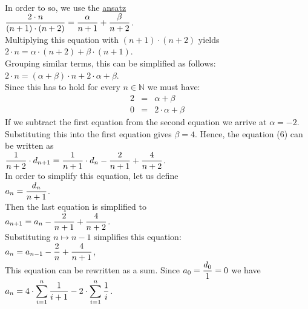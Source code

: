 \\[0.2cm] 
In order to so, we use the \href{http://en.wikipedia.org/wiki/Ansatz}{ansatz}
\\[0.2cm]
\hspace*{1.3cm}
$\displaystyle\frac{2\cdot n}{(n+1)\cdot(n+2)} = \frac{\alpha}{n+1} + \frac{\beta}{n+2}$.
\\[0.2cm] 
Multiplying this equation with $(n+1) \cdot (n+2)$ yields
\\[0.2cm]
\hspace*{1.3cm}
$ 2\cdot n = \alpha \cdot (n+2) + \beta \cdot (n+1)$.
\\[0.2cm]
Grouping similar terms, this can be simplified as follows:
\\[0.2cm]
\hspace*{1.3cm}
$2\cdot n = (\alpha + \beta) \cdot n + 2 \cdot \alpha  + \beta$.
\\[0.2cm]
Since this has to hold for every $n \in \mathbb{N}$ we must have:
\begin{eqnarray*}
  2 & = & \alpha + \beta \\
  0 & = & 2 \cdot \alpha + \beta 
\end{eqnarray*}
If we subtract the first equation from the second equation we arrive at
 $\alpha = -2$.  Substituting this into the first equation gives $\beta = 4$.
Hence, the equation (6) can be written as
\\[0.2cm]
\hspace*{1.3cm}
$\displaystyle\frac{1}{n+2} \cdot d_{n+1} = \frac{1}{n+1}\cdot d_{n} - \frac{2}{n+1} + \frac{4}{n+2}$.  
\\[0.2cm]  
In order to simplify this equation, let us define
\\[0.2cm]
\hspace*{1.3cm}
 $\displaystyle a_n = \frac{d_n}{n+1}$. 
\\[0.2cm] 
Then the last equation is simplified to
\\[0.2cm]
\hspace*{1.3cm}
$\displaystyle a_{n+1} = a_{n} - \frac{2}{n+1} + \frac{4}{n+2}$.
\\[0.2cm] 
Substituting $n \mapsto n-1$ simplifies this equation: 
\\[0.2cm]
\hspace*{1.3cm}
$\displaystyle a_{n} = a_{n-1} - \frac{2}{n} + \frac{4}{n+1}$,
\\[0.2cm] 
This equation can be rewritten as a sum.  Since $a_0 = \displaystyle\frac{d_0}{1} = 0$
we have
\\[0.2cm]
\hspace*{1.3cm}
$\displaystyle a_{n} = 4 \cdot \sum\limits_{i=1}^n \frac{1}{i+1} - 2 \cdot \sum\limits_{i=1}^n \frac{1}{i}$.  
